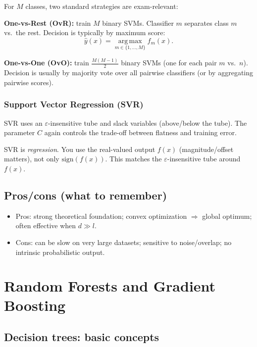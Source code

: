 \documentclass[11pt, oneside]{book}
\newcommand{\argmax}{\operatorname*{arg\,max}}
\newcommand{\1}{\ind}                       %
\begin{document}
For $M$ classes, two standard strategies are exam-relevant:

\textbf{One-vs-Rest (OvR):} train $M$ binary SVMs. Classifier $m$ separates class $m$ vs.\ the rest.
Decision is typically by maximum score:
\[
\hat y(x)=\argmax_{m\in\{1,\dots,M\}} f_m(x).
\]

\textbf{One-vs-One (OvO):} train $\frac{M(M-1)}{2}$ binary SVMs (one for each pair $m$ vs.\ $n$).
Decision is usually by majority vote over all pairwise classifiers (or by aggregating pairwise scores).

\subsection{Support Vector Regression (SVR)}
SVR uses an $\varepsilon$-insensitive tube and slack variables (above/below the tube).
The parameter $C$ again controls the trade-off between flatness and training error.

\begin{notebox}[title={Exam Pitfall: SVR Uses Real-Valued Output}]
SVR is \emph{regression}. You use the real-valued output $f(x)$ (magnitude/offset matters),
not only $\mathrm{sign}(f(x))$. This matches the $\varepsilon$-insensitive tube around $f(x)$.
\end{notebox}

\section{Pros/cons (what to remember)}
\begin{itemize}
  \item Pros: strong theoretical foundation; convex optimization $\Rightarrow$ global optimum; often effective when $d\gg l$.
  \item Cons: can be slow on very large datasets; sensitive to noise/overlap; no intrinsic probabilistic output.
\end{itemize}

\chapter{Random Forests and Gradient Boosting}

\section{Decision trees: basic concepts}
\end{document}

